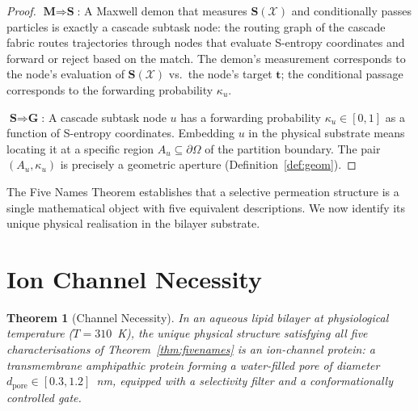 \documentclass[11pt,twocolumn,a4paper]{article}
\newtheorem{theorem}{Theorem}[section]
\theoremstyle{definition}
\theoremstyle{remark}
\newcommand{\kap}{\kappa}
\newcommand{\Sent}{\bm{S}}
\begin{document}
\begin{proof}
\vspace{4pt}
\noindent$\textbf{M} \Rightarrow \textbf{S}$: A Maxwell demon that measures
$\Sent(\mathcal{X})$ and conditionally passes particles is exactly a cascade
subtask node: the routing graph of the cascade fabric \citep{companion5}
routes trajectories through nodes that evaluate S-entropy coordinates and
forward or reject based on the match. The demon's measurement corresponds to
the node's evaluation of $\Sent(\mathcal{X})$ vs.\ the node's target $\mathbf{t}$;
the conditional passage corresponds to the forwarding probability $\kap_u$.

\vspace{4pt}
\noindent$\textbf{S} \Rightarrow \textbf{G}$: A cascade subtask node $u$ has
a forwarding probability $\kap_u \in [0,1]$ as a function of S-entropy
coordinates. Embedding $u$ in the physical substrate means locating it at a
specific region $A_u \subseteq \partial\Omega$ of the partition boundary. The
pair $(A_u, \kap_u)$ is precisely a geometric aperture (Definition~\ref{def:geom}).
\end{proof}

The Five Names Theorem establishes that a selective permeation structure is a
single mathematical object with five equivalent descriptions. We now identify its
unique physical realisation in the bilayer substrate.

\section{Ion Channel Necessity}
\label{sec:channelnec}

\begin{theorem}[Channel Necessity]
\label{thm:channelnec}
In an aqueous lipid bilayer at physiological temperature ($T = 310$~K),
the unique physical structure satisfying all five characterisations of
Theorem~\ref{thm:fivenames} is an ion-channel protein: a transmembrane
amphipathic protein forming a water-filled pore of diameter
$d_{\mathrm{pore}} \in [0.3, 1.2]$~nm, equipped with a selectivity filter
and a conformationally controlled gate.
\end{theorem}
\end{document}
